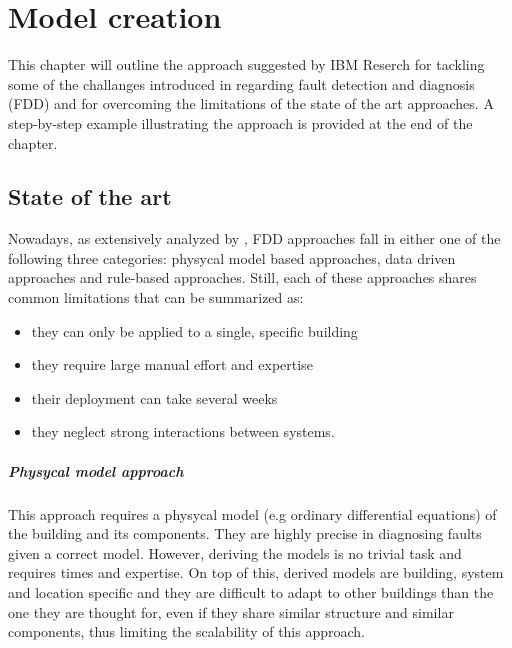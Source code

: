 \chapter{Model creation} \label{ch:model}

This chapter will outline the approach suggested by IBM Reserch for tackling some of the challanges introduced in  regarding fault detection and diagnosis (FDD) and for overcoming the limitations of the state of the art approaches. A step-by-step example illustrating the approach is provided at the end of the chapter.

\section{State of the art}
Nowadays, as extensively analyzed by \textcite{methods_for_diagnostic}, FDD approaches fall in either one of the following three categories: physycal model based approaches, data driven approaches and rule-based approaches. Still, each of these approaches shares common limitations that can be summarized as:
\begin{itemize}
  \item they can only be applied to a single, specific building
  \item they require large manual effort and expertise
  \item their deployment can take several weeks
  \item they neglect strong interactions between systems.
\end{itemize}

\paragraph{Physycal model approach} \label{subsec:phy_models}
This approach requires a physycal model (e.g ordinary differential equations) of the building and its components. They are highly precise in diagnosing faults given a correct model. However, deriving the models is no trivial task and requires times and expertise. On top of this, derived models are building, system and location specific and they are difficult to adapt to other buildings than the one they are thought for, even if they share similar structure and similar components, thus limiting the scalability of this approach.

